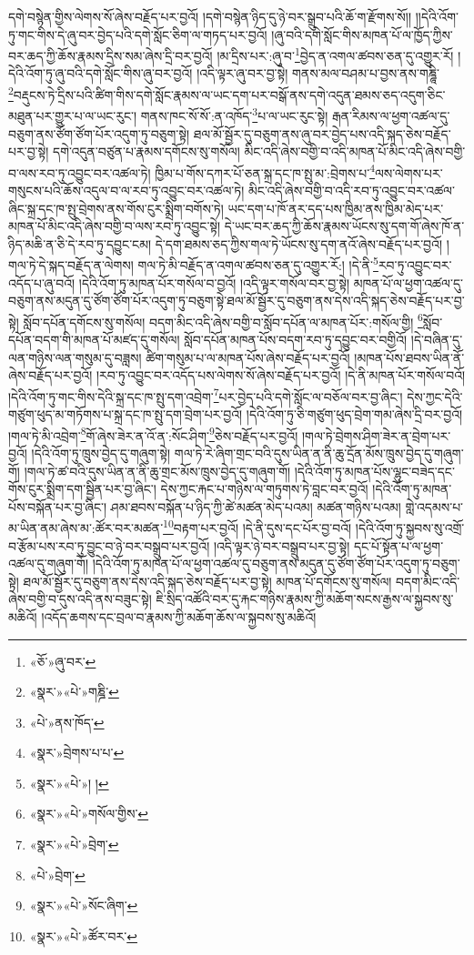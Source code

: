 དགེ་བསྙེན་གྱིས་ལེགས་སོ་ཞེས་བརྗོད་པར་བྱའོ། །དགེ་བསྙེན་ཉིད་དུ་ཉེ་བར་སྒྲུབ་པའི་ཆོ་ག་རྫོགས་སོ།། །།དེའི་འོག་ཏུ་གང་གིས་དེ་ཞུ་བར་བྱེད་པའི་དགེ་སློང་ཅིག་ལ་གཏད་པར་བྱའོ། །ཞུ་བའི་དགེ་སློང་གིས་མཁན་པོ་ལ་ཁྱོད་ཀྱིས་བར་ཆད་ཀྱི་ཆོས་རྣམས་དྲིས་སམ་ཞེས་དྲི་བར་བྱའོ། །མ་དྲིས་པར་:ཞུ་བ་\footnote{«ཅོ་»ཞུ་བར་}བྱེད་ན་འགལ་ཚབས་ཅན་དུ་འགྱུར་རོ། །དེའི་འོག་ཏུ་ཞུ་བའི་དགེ་སློང་གིས་ཞུ་བར་བྱའོ། །འདི་ལྟར་ཞུ་བར་བྱ་སྟེ། གནས་མལ་བཤམ་པ་བྱས་ནས་གཎྜཱི་\footnote{«སྣར་»«པེ་»གཎྜི་}བརྡུངས་ཏེ་དྲིས་པའི་ཚིག་གིས་དགེ་སློང་རྣམས་ལ་ཡང་དག་པར་བསྒོ་ནས་དགེ་འདུན་ཐམས་ཅད་འདུག་ཅིང་མཐུན་པར་གྱུར་པ་ལ་ཡང་རུང་། གནས་ཁང་སོ་སོ་:ན་འཁོད་\footnote{«པེ་»ནས་ཁོད་}པ་ལ་ཡང་རུང་སྟེ། རྒན་རིམས་ལ་ཕྱག་འཚལ་དུ་བཅུག་ནས་ཙོག་ཙོག་པོར་འདུག་ཏུ་བཅུག་སྟེ། ཐལ་མོ་སྦྱོར་དུ་བཅུག་ནས་ཞུ་བར་བྱེད་པས་འདི་སྐད་ཅེས་བརྗོད་པར་བྱ་སྟེ། དགེ་འདུན་བཙུན་པ་རྣམས་དགོངས་སུ་གསོལ། མིང་འདི་ཞེས་བགྱི་བ་འདི་མཁན་པོ་མིང་འདི་ཞེས་བགྱི་བ་ལས་རབ་ཏུ་འབྱུང་བར་འཚལ་ཏེ། ཁྱིམ་པ་གོས་དཀར་པོ་ཅན་སྐྲ་དང་ཁ་སྤུ་མ་:བྲེགས་པ་\footnote{«སྣར་»བྲེགས་པ་པ་}ལས་ལེགས་པར་གསུངས་པའི་ཆོས་འདུལ་བ་ལ་རབ་ཏུ་འབྱུང་བར་འཚལ་ཏེ། མིང་འདི་ཞེས་བགྱི་བ་འདི་རབ་ཏུ་འབྱུང་བར་འཚལ་ཞིང་སྐྲ་དང་ཁ་སྤུ་བྲེགས་ནས་གོས་ངུར་སྨྲིག་བགོས་ཏེ། ཡང་དག་པ་ཁོ་ནར་དད་པས་ཁྱིམ་ནས་ཁྱིམ་མེད་པར་མཁན་པོ་མིང་འདི་ཞེས་བགྱི་བ་ལས་རབ་ཏུ་འབྱུང་སྟེ། དེ་ཡང་བར་ཆད་ཀྱི་ཆོས་རྣམས་ཡོངས་སུ་དག་གོ་ཞེས་ཁོ་ན་ཉིད་མཆི་ན་ཅི་དེ་རབ་ཏུ་དབྱུང་ངམ། དེ་དག་ཐམས་ཅད་ཀྱིས་གལ་ཏེ་ཡོངས་སུ་དག་ནའོ་ཞེས་བརྗོད་པར་བྱའོ། །གལ་ཏེ་དེ་སྐད་བརྗོད་ན་ལེགས། གལ་ཏེ་མི་བརྗོད་ན་འགལ་ཚབས་ཅན་དུ་འགྱུར་རོ:། །དེ་ནི་\footnote{«སྣར་»«པེ་»། །}རབ་ཏུ་འབྱུང་བར་འདོད་པ་ཞུ་བའོ། །དེའི་འོག་ཏུ་མཁན་པོར་གསོལ་བ་བྱའོ། །འདི་ལྟར་གསོལ་བར་བྱ་སྟེ། མཁན་པོ་ལ་ཕྱག་འཚལ་དུ་བཅུག་ནས་མདུན་དུ་ཙོག་ཙོག་པོར་འདུག་ཏུ་བཅུག་སྟེ་ཐལ་མོ་སྦྱོར་དུ་བཅུག་ནས་དེས་འདི་སྐད་ཅེས་བརྗོད་པར་བྱ་སྟེ། སློབ་དཔོན་དགོངས་སུ་གསོལ། བདག་མིང་འདི་ཞེས་བགྱི་བ་སློབ་དཔོན་ལ་མཁན་པོར་:གསོལ་གྱི། \footnote{«སྣར་»«པེ་»གསོལ་གྱིས་}སློབ་དཔོན་བདག་གི་མཁན་པོ་མཛད་དུ་གསོལ། སློབ་དཔོན་མཁན་པོས་བདག་རབ་ཏུ་དབྱུང་བར་བགྱིའོ། །དེ་བཞིན་དུ་ལན་གཉིས་ལན་གསུམ་དུ་བཟླས། ཚིག་གསུམ་པ་ལ་མཁན་པོས་ཞེས་བརྗོད་པར་བྱའོ། །མཁན་པོས་ཐབས་ཡིན་ནོ་ཞེས་བརྗོད་པར་བྱའོ། །རབ་ཏུ་འབྱུང་བར་འདོད་པས་ལེགས་སོ་ཞེས་བརྗོད་པར་བྱའོ། །དེ་ནི་མཁན་པོར་གསོལ་བའོ། །དེའི་འོག་ཏུ་གང་གིས་དེའི་སྐྲ་དང་ཁ་སྤུ་དག་འབྲེག་\footnote{«སྣར་»«པེ་»བྲེག་}པར་བྱེད་པའི་དགེ་སློང་ལ་བཅོལ་བར་བྱ་ཞིང་། དེས་ཀྱང་དེའི་གཙུག་ཕུད་མ་གཏོགས་པ་སྐྲ་དང་ཁ་སྤུ་དག་བྲེག་པར་བྱའོ། །དེའི་འོག་ཏུ་ཅི་གཙུག་ཕུད་བྲེག་གམ་ཞེས་དྲི་བར་བྱའོ། །གལ་ཏེ་མི་འབྲེག་\footnote{«པེ་»བྲེག་}གོ་ཞེས་ཟེར་ན་འོ་ན་:སོང་ཤིག་\footnote{«སྣར་»«པེ་»སོང་ཞིག་}ཅེས་བརྗོད་པར་བྱའོ། །གལ་ཏེ་བྲེགས་ཤིག་ཟེར་ན་བྲེག་པར་བྱའོ། །དེའི་འོག་ཏུ་ཁྲུས་བྱེད་དུ་གཞུག་སྟེ། གལ་ཏེ་རེ་ཞིག་གྲང་བའི་དུས་ཡིན་ན་ནི་ཆུ་དྲོན་མོས་ཁྲུས་བྱེད་དུ་གཞུག་གོ། །གལ་ཏེ་ཚ་བའི་དུས་ཡིན་ན་ནི་ཆུ་གྲང་མོས་ཁྲུས་བྱེད་དུ་གཞུག་གོ། །དེའི་འོག་ཏུ་མཁན་པོས་ལྷུང་བཟེད་དང་གོས་ངུར་སྨྲིག་དག་སྦྱིན་པར་བྱ་ཞིང་། དེས་ཀྱང་རྐང་པ་གཉིས་ལ་གཏུགས་ཏེ་བླང་བར་བྱའོ། །དེའི་འོག་ཏུ་མཁན་པོས་བསྐོན་པར་བྱ་ཞིང་། ཤམ་ཐབས་བསྐོན་པ་ཉིད་ཀྱི་ཚེ་མཚན་མེད་པའམ། མཚན་གཉིས་པའམ། གླེ་འདམས་པ་མ་ཡིན་ནམ་ཞེས་མ་:ཚོར་བར་མཚན་\footnote{«སྣར་»«པེ་»ཚོར་བར་}བརྟག་པར་བྱའོ། །དེ་ནི་དུས་དང་པོར་བྱ་བའོ། །དེའི་འོག་ཏུ་སྐྱབས་སུ་འགྲོ་བ་རྩོམ་པས་རབ་ཏུ་བྱུང་བ་ཉེ་བར་བསྒྲུབ་པར་བྱའོ། །འདི་ལྟར་ཉེ་བར་བསྒྲུབ་པར་བྱ་སྟེ། དང་པོ་སྟོན་པ་ལ་ཕྱག་འཚལ་དུ་གཞུག་གོ། །དེའི་འོག་ཏུ་མཁན་པོ་ལ་ཕྱག་འཚལ་དུ་བཅུག་ནས་མདུན་དུ་ཙོག་ཙོག་པོར་འདུག་ཏུ་བཅུག་སྟེ། ཐལ་མོ་སྦྱོར་དུ་བཅུག་ནས་དེས་འདི་སྐད་ཅེས་བརྗོད་པར་བྱ་སྟེ། མཁན་པོ་དགོངས་སུ་གསོལ། བདག་མིང་འདི་ཞེས་བགྱི་བ་དུས་འདི་ནས་བཟུང་སྟེ། ཇི་སྲིད་འཚོའི་བར་དུ་རྐང་གཉིས་རྣམས་ཀྱི་མཆོག་སངས་རྒྱས་ལ་སྐྱབས་སུ་མཆིའོ། །འདོད་ཆགས་དང་བྲལ་བ་རྣམས་ཀྱི་མཆོག་ཆོས་ལ་སྐྱབས་སུ་མཆིའོ། 